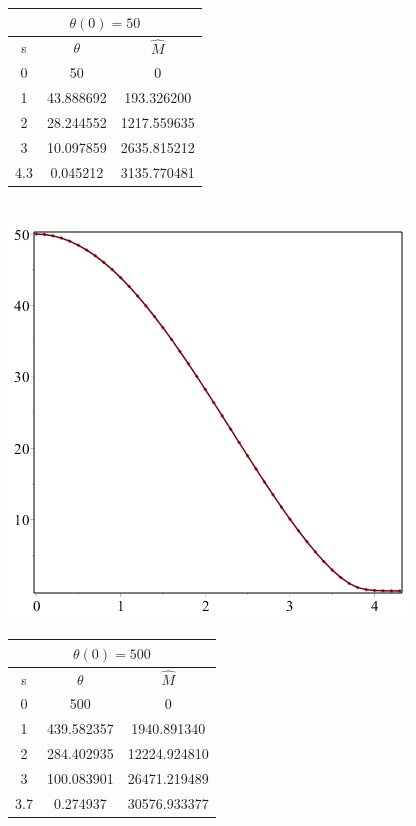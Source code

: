 \documentclass[11pt]{article} %
\begin{document}
\begin{tabular}{ | c c c |}
\multicolumn{3}{c}{ $\theta(0) = 50$ } \\
\hline
s & $\theta$ & $\hat M$\\
\hline
0 & 50 & 0\\
1 &43.888692 &193.326200 \\
2 &28.244552&1217.559635\\
3 & 10.097859& 2635.815212\\
4.3 &0.045212 &3135.770481\\
\hline
\end{tabular}\\
\includegraphics[scale=.5]{plots/wd4.png}\\
\begin{tabular}{ | c c c |}
\multicolumn{3}{c}{ $\theta(0) = 500$ } \\
\hline
s & $\theta$ & $\hat M$\\
\hline
0 & 500 & 0\\
1 &439.582357 &1940.891340 \\
2 &284.402935&12224.924810\\
3 & 100.083901& 26471.219489\\
3.7 &0.274937 &30576.933377\\
\hline
\end{tabular}\\
\end{document}
